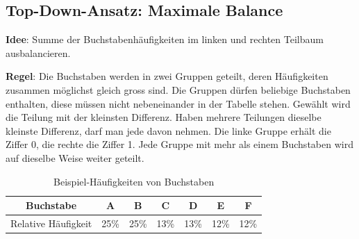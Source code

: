 \subsection{Top-Down-Ansatz: Maximale Balance}
\textbf{Idee}: Summe der Buchstabenhäufigkeiten im linken und rechten Teilbaum ausbalancieren.

\textbf{Regel}: Die Buchstaben werden in zwei Gruppen geteilt, deren Häufigkeiten zusammen möglichst gleich gross sind. Die Gruppen dürfen beliebige Buchstaben enthalten, diese müssen nicht nebeneinander in der Tabelle stehen. Gewählt wird die Teilung mit der kleinsten Differenz. Haben mehrere Teilungen dieselbe kleinste Differenz, darf man jede davon nehmen. Die linke Gruppe erhält die Ziffer 0, die rechte die Ziffer 1. Jede Gruppe mit mehr als einem Buchstaben wird auf dieselbe Weise weiter geteilt.

\begin{table}[H]
	\centering
	\begin{tabular}{ccccccc}
		\textbf{Buchstabe}  & \textbf{A} & \textbf{B} & \textbf{C} & \textbf{D} & \textbf{E} & \textbf{F} \\\midrule
		Relative Häufigkeit & 25\%       & 25\%       & 13\%       & 13\%       & 12\%       & 12\%
	\end{tabular}
	\caption{Beispiel-Häufigkeiten von Buchstaben}
	\label{table:ex-topdown}
\end{table}

